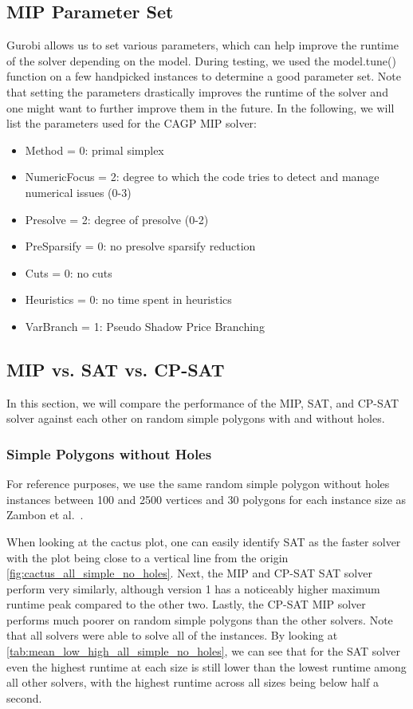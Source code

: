 \subsection{MIP Parameter Set}
Gurobi allows us to set various parameters, which can help improve the runtime of the solver depending on the model. During testing, we used the model.tune() function on a few handpicked instances to determine a good parameter set. Note that setting the parameters drastically improves the runtime of the solver and one might want to further improve them in the future. In the following, we will list the parameters used for the CAGP MIP solver:
\begin{itemize}
  \item Method = 0: primal simplex
  \item NumericFocus = 2: degree to which the code tries to detect and manage numerical issues (0-3)
  \item Presolve = 2: degree of presolve (0-2)
  \item PreSparsify = 0: no presolve sparsify reduction
  \item Cuts = 0: no cuts
  \item Heuristics = 0: no time spent in heuristics
  \item VarBranch = 1: Pseudo Shadow Price Branching
\end{itemize}

\subsection{MIP vs. SAT vs. CP-SAT}
In this section, we will compare the performance of the MIP, SAT, and CP-SAT solver against each other on random simple polygons with and without holes.

\subsubsection{Simple Polygons without Holes}
For reference purposes, we use the same random simple polygon without holes instances between 100 and 2500 vertices and 30 polygons for each instance size as Zambon et al.~\cite{art-gallery-instances-page}.

When looking at the cactus plot, one can easily identify SAT as the faster solver with the plot being close to a vertical line from the origin \cref{fig:cactus_all_simple_no_holes}. Next, the MIP and CP-SAT SAT solver perform very similarly, although version 1 has a noticeably higher maximum runtime peak compared to the other two. Lastly, the CP-SAT MIP solver performs much poorer on random simple polygons than the other solvers. Note that all solvers were able to solve all of the instances. By looking at \cref{tab:mean_low_high_all_simple_no_holes}, we can see that for the SAT solver even the highest runtime at each size is still lower than the lowest runtime among all other solvers, with the highest runtime across all sizes being below half a second.

